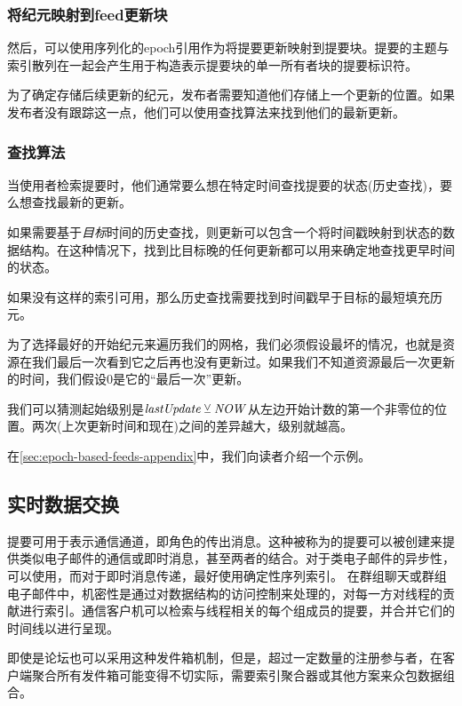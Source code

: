 \subsubsection{将纪元映射到feed更新块}

然后，可以使用序列化的epoch引用作为将提要更新映射到提要块。提要的主题与索引散列在一起会产生用于构造表示提要块的单一所有者块的提要标识符。 

为了确定存储后续更新的纪元，发布者需要知道他们存储上一个更新的位置。如果发布者没有跟踪这一点，他们可以使用查找算法来找到他们的最新更新。



\subsubsection{查找算法}

当使用者检索提要时，他们通常要么想在特定时间查找提要的状态(历史查找)，要么想查找最新的更新。

如果需要基于\emph{目标}时间的历史查找，则更新可以包含一个将时间戳映射到状态的数据结构。在这种情况下，找到比目标晚的任何更新都可以用来确定地查找更早时间的状态。 

如果没有这样的索引可用，那么历史查找需要找到时间戳早于目标的最短填充历元。 

为了选择最好的开始纪元来遍历我们的网格，我们必须假设最坏的情况，也就是资源在我们最后一次看到它之后再也没有更新过。如果我们不知道资源最后一次更新的时间，我们假设0是它的“最后一次”更新。

我们可以猜测起始级别是$\mathit{lastUpdate}\veebar \mathit{NOW}$从左边开始计数的第一个非零位的位置。两次(上次更新时间和现在)之间的差异越大，级别就越高。

在\ref{sec:epoch-based-feeds-appendix}中，我们向读者介绍一个示例。

\subsection{实时数据交换}\label{sec:feed-as-channel}

提要可用于表示通信通道，即角色的传出消息。这种被称为的提要可以被创建来提供类似电子邮件的通信或即时消息，甚至两者的结合。对于类电子邮件的异步性，可以使用，而对于即时消息传递，最好使用确定性序列索引。 
在群组聊天或群组电子邮件中，机密性是通过对数据结构的访问控制来处理的，对每一方对线程的贡献进行索引。通信客户机可以检索与线程相关的每个组成员的提要，并合并它们的时间线以进行呈现。 

即使是论坛也可以采用这种发件箱机制，但是，超过一定数量的注册参与者，在客户端聚合所有发件箱可能变得不切实际，需要索引聚合器或其他方案来众包数据组合。

